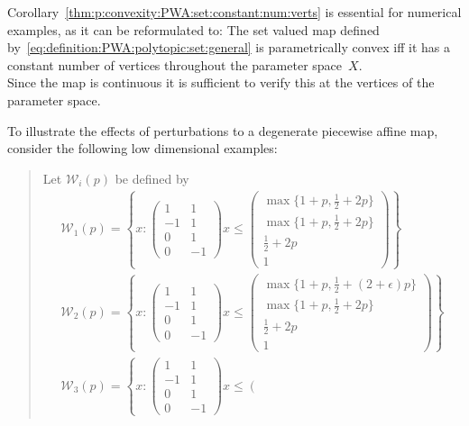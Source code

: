 %
\begin{rem}
Corollary~\ref{thm:p:convexity:PWA:set:constant:num:verts} is essential for numerical examples, as it can be reformulated to:
%
The set valued map defined by~\eqref{eq:definition:PWA:polytopic:set:general} is parametrically convex iff it has a constant 
number of vertices throughout the parameter space~$X$.
%
\\[1em]
%
Since the map is continuous it is sufficient to verify this at the vertices of the parameter space.
%
\end{rem}
%
To illustrate the effects of perturbations to a degenerate piecewise affine map, consider the following low dimensional 
examples:
%
\begin{quote}
Let $\mathcal W_i(p)$ be defined by
%
\begin{equation*}\begin{split}
	\mathcal W_1(p) = \left\{x : \left(\begin{array}{cc}
	1&1\\
	-1&1\\
	0&1\\
	0&-1 
	\end{array}\right)x \leq \left(\begin{array}{c}
	\max\{1+p,\frac{1}{2}+2p\} \\
	\max\{1+p,\frac{1}{2}+2p\} \\
	\frac{1}{2}+2p \\
	1
	\end{array}\right)
	\right\}\\
%
	\mathcal W_2(p) = \left\{x : \left(\begin{array}{cc}
	1&1\\
	-1&1\\
	0&1\\
	0&-1 
	\end{array}\right)x \leq \left(\begin{array}{c}
	\max\{1+p,\frac{1}{2}+(2+\epsilon)p\} \\
	\max\{1+p,\frac{1}{2}+2p\} \\
	\frac{1}{2}+2p \\
	1
	\end{array}\right)
	\right\}\\
%
	\mathcal W_3(p) = \left\{x : \left(\begin{array}{cc}
	1&1\\
	-1&1\\
	0&1\\
	0&-1 
	\end{array}\right)x \leq \left(\begin{array}{c}

\end{array}
\end{split}
\end{equation*}
\end{quote}
